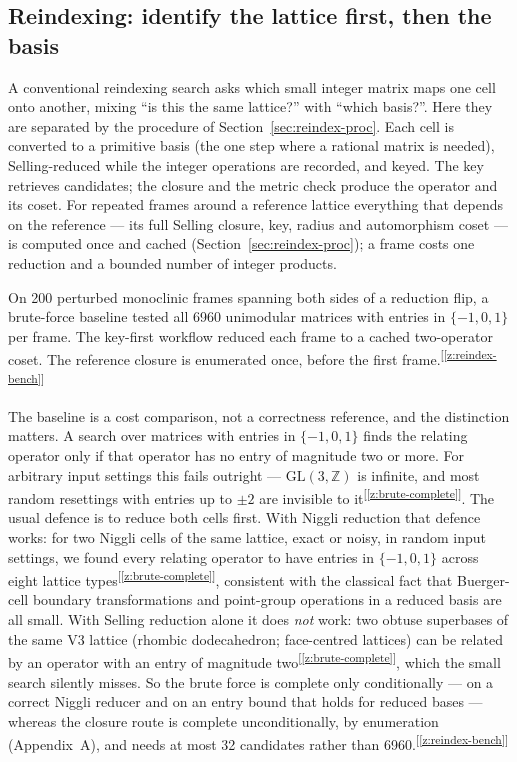 \documentclass[11pt]{article}
\newcommand{\chk}[1]{\textsuperscript{[\ref{#1}]}}
\begin{document}
\subsection{Reindexing: identify the lattice first, then the basis}

A conventional reindexing search asks which small integer matrix maps one cell onto another, mixing ``is this the same lattice?'' with ``which basis?''. Here they are separated by the procedure of Section~\ref{sec:reindex-proc}. Each cell is converted to a primitive basis (the one step where a rational matrix is needed), Selling-reduced while the integer operations are recorded, and keyed. The key retrieves candidates; the closure and the metric check produce the operator and its coset. For repeated frames around a reference lattice everything that depends on the reference --- its full Selling closure, key, radius and automorphism coset --- is computed once and cached (Section~\ref{sec:reindex-proc}); a frame costs one reduction and a bounded number of integer products.

On 200 perturbed monoclinic frames spanning both sides of a reduction flip, a brute-force baseline tested all 6960 unimodular matrices with entries in $\{-1,0,1\}$ per frame. The key-first workflow reduced each frame to a cached two-operator coset. The reference closure is enumerated once, before the first frame.\chk{z:reindex-bench}

The baseline is a cost comparison, not a correctness reference, and the distinction matters. A search over matrices with entries in $\{-1,0,1\}$ finds the relating operator only if that operator has no entry of magnitude two or more. For arbitrary input settings this fails outright --- $\mathrm{GL}(3,\mathbb Z)$ is infinite, and most random resettings with entries up to $\pm2$ are invisible to it\chk{z:brute-complete}. The usual defence is to reduce both cells first. With Niggli reduction that defence works: for two Niggli cells of the same lattice, exact or noisy, in random input settings, we found every relating operator to have entries in $\{-1,0,1\}$ across eight lattice types\chk{z:brute-complete}, consistent with the classical fact that Buerger-cell boundary transformations and point-group operations in a reduced basis are all small. With Selling reduction alone it does \emph{not} work: two obtuse superbases of the same V3 lattice (rhombic dodecahedron; face-centred lattices) can be related by an operator with an entry of magnitude two\chk{z:brute-complete}, which the small search silently misses. So the brute force is complete only conditionally --- on a correct Niggli reducer and on an entry bound that holds for reduced bases --- whereas the closure route is complete unconditionally, by enumeration (Appendix~A), and needs at most 32 candidates rather than 6960.\chk{z:reindex-bench}
\end{document}
